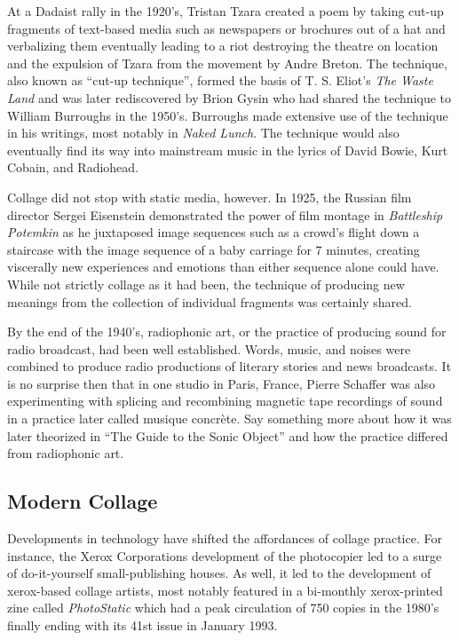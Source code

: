 At a Dadaist rally in the 1920's, Tristan Tzara created a poem by taking cut-up fragments of text-based media such as newspapers or brochures out of a hat and verbalizing them eventually leading to a riot destroying the theatre on location and the expulsion of Tzara from the movement by Andre Breton.  The technique, also known as ``cut-up technique'', formed the basis of T. S. Eliot's \textit{The Waste Land} and was later rediscovered by Brion Gysin who had shared the technique to William Burroughs in the 1950's.  Burroughs made extensive use of the technique in his writings, most notably in \textit{Naked Lunch}.  The technique would also eventually find its way into mainstream music in the lyrics of David Bowie, Kurt Cobain, and Radiohead.  

Collage did not stop with static media, however.  In 1925, the Russian film director Sergei Eisenstein demonstrated the power of film montage in \textit{Battleship Potemkin} as he juxtaposed image sequences such as a crowd's flight down a staircase with the image sequence of a baby carriage for 7 minutes, creating viscerally new experiences and emotions than either sequence alone could have.  While not strictly collage as it had been, the technique of producing new meanings from the collection of individual fragments was certainly shared.  

By the end of the 1940's, radiophonic art, or the practice of producing sound for radio broadcast, had been well established.  Words, music, and noises were combined to produce radio productions of literary stories and news broadcasts.  It is no surprise then that in one studio in Paris, France, Pierre Schaffer was also experimenting with splicing and recombining magnetic tape recordings of sound in a practice later called musique concr\`ete.  Say something more about how it was later theorized in ``The Guide to the Sonic Object'' and how the practice differed from radiophonic art.

\subsection{Modern Collage}
Developments in technology have shifted the affordances of collage practice.  For instance, the Xerox Corporations development of the photocopier led to a surge of do-it-yourself small-publishing houses.  As well, it led to the development of xerox-based collage artists, most notably featured in a bi-monthly xerox-printed zine called \textit{PhotoStatic} which had a peak circulation of 750 copies in the 1980's finally ending with its 41st issue in January 1993.

